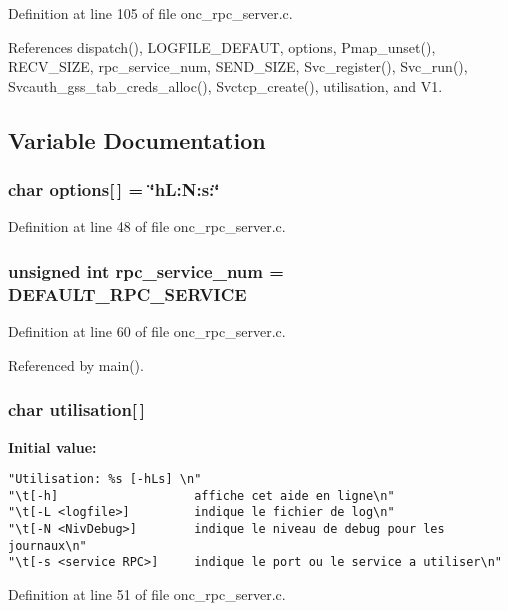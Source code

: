 Definition at line 105 of file onc\_\-rpc\_\-server.c.

References dispatch(), LOGFILE\_\-DEFAUT, options, Pmap\_\-unset(), RECV\_\-SIZE, rpc\_\-service\_\-num, SEND\_\-SIZE, Svc\_\-register(), Svc\_\-run(), Svcauth\_\-gss\_\-tab\_\-creds\_\-alloc(), Svctcp\_\-create(), utilisation, and V1.

\subsection{Variable Documentation}
\subsubsection{\setlength{\rightskip}{0pt plus 5cm}char {\bf options}[$\,$] = \char`\"{}h\-L:N:s:\char`\"{}}\label{onc__rpc__server_8c_a9}




Definition at line 48 of file onc\_\-rpc\_\-server.c.
\subsubsection{\setlength{\rightskip}{0pt plus 5cm}unsigned int {\bf rpc\_\-service\_\-num} = DEFAULT\_\-RPC\_\-SERVICE}\label{onc__rpc__server_8c_a12}




Definition at line 60 of file onc\_\-rpc\_\-server.c.

Referenced by main().
\subsubsection{\setlength{\rightskip}{0pt plus 5cm}char {\bf utilisation}[$\,$]}\label{onc__rpc__server_8c_a10}


{\bf Initial value:}

\footnotesize\begin{verbatim} 
"Utilisation: %s [-hLs] \n"
"\t[-h]                   affiche cet aide en ligne\n"
"\t[-L <logfile>]         indique le fichier de log\n"
"\t[-N <NivDebug>]        indique le niveau de debug pour les journaux\n" 
"\t[-s <service RPC>]     indique le port ou le service a utiliser\n"
\end{verbatim}\normalsize 


Definition at line 51 of file onc\_\-rpc\_\-server.c.